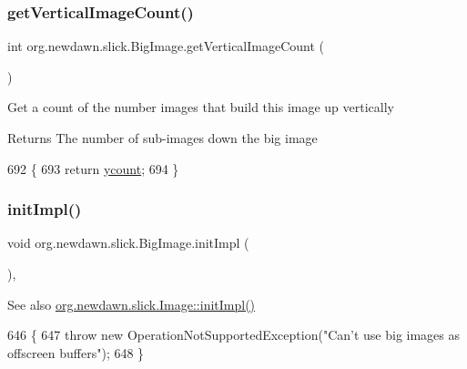 \subsubsection{\texorpdfstring{get\+Vertical\+Image\+Count()}{getVerticalImageCount()}}
{\footnotesize\ttfamily int org.\+newdawn.\+slick.\+Big\+Image.\+get\+Vertical\+Image\+Count (\begin{DoxyParamCaption}{ }\end{DoxyParamCaption})\hspace{0.3cm}{\ttfamily [inline]}}

Get a count of the number images that build this image up vertically

\begin{DoxyReturn}{Returns}
The number of sub-\/images down the big image 
\end{DoxyReturn}

\begin{DoxyCode}
692                                        \{
693         \textcolor{keywordflow}{return} \mbox{\hyperlink{classorg_1_1newdawn_1_1slick_1_1_big_image_a699c6b87723d356a7062f79c35c6be5a}{ycount}};
694     \} 
\end{DoxyCode}
\mbox{\label{classorg_1_1newdawn_1_1slick_1_1_big_image_a49af5bbb03ef5ea49bc3b8933803c3a6}} 
\subsubsection{\texorpdfstring{init\+Impl()}{initImpl()}}
{\footnotesize\ttfamily void org.\+newdawn.\+slick.\+Big\+Image.\+init\+Impl (\begin{DoxyParamCaption}{ }\end{DoxyParamCaption})\hspace{0.3cm}{\ttfamily [inline]}, {\ttfamily [protected]}}

\begin{DoxySeeAlso}{See also}
\mbox{\hyperlink{classorg_1_1newdawn_1_1slick_1_1_image_afc518253119ab1acad5e36b486e2f3f4}{org.\+newdawn.\+slick.\+Image\+::init\+Impl()}} 
\end{DoxySeeAlso}

\begin{DoxyCode}
646                               \{
647         \textcolor{keywordflow}{throw} \textcolor{keyword}{new} OperationNotSupportedException(\textcolor{stringliteral}{"Can't use big images as offscreen buffers"});
648     \}
\end{DoxyCode}
\mbox{\label{classorg_1_1newdawn_1_1slick_1_1_big_image_ac1f5655e3a5bab1619ddd3acbad7da7c}} 
